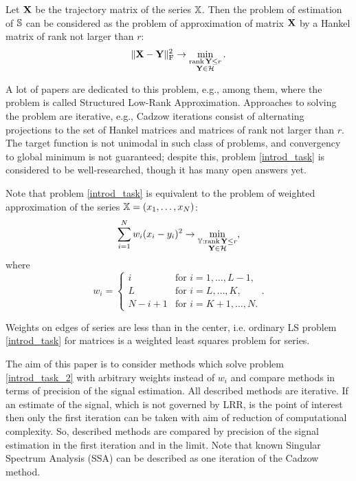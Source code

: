\documentclass[sii]{ipart}
\def\rank{\mathop{\mathrm{rank}}}
\begin{document}
Let $\mathbf{X}$ be the trajectory matrix of the series $\mathbb{X}$. Then the problem of estimation of $\mathbb{S}$ can be considered as the problem of approximation of matrix $\mathbf{X}$ by a Hankel matrix of rank not larger than $r$:
\begin{equation}\label{introd_task}
\|\bfX - \bfY\|^2_\rmF \to \min_{\substack{\rank \bfY \le r \\ \bfY \in \calH}}.
\end{equation}

A lot of papers are dedicated to this problem, e.g., \cite{Cadzow1988, Markovsky2011, Usevich.Markovsky2014, Gillard.Zhigljavsky2013} among them, where the problem is called Structured Low-Rank Approximation. Approaches to solving the problem are iterative, e.g., Cadzow iterations \cite{Cadzow1988} consist of alternating projections to the set of Hankel matrices and matrices of rank not larger than $r$. The target function is not unimodal in such class of problems, and convergency to global minimum is not guaranteed; despite this, problem \eqref{introd_task} is considered to be well-researched, though it has many open answers yet.

Note that problem \eqref{introd_task} is equivalent to the problem of weighted approximation of the series $\mathbb{X} = (x_1, \ldots, x_N)$:
\begin{equation}\label{introd_task_2}
\sum_{i = 1}^N w_i(x_i - y_i)^2 \to \min_{\substack{\tsY: \rank \bfY \le r \\ \bfY \in \calH}},
\end{equation}
where
\begin{equation}
\label{eq:w}
w_i = \begin{cases}
i & \text{for $i = 1, \ldots, L-1,$}\\
L & \text{for $i = L, \ldots, K,$}\\
N - i + 1 & \text{for $i = K + 1, \ldots, N.$}
\end{cases}.
\end{equation}

Weights on edges of series are less than in the center, i.e. ordinary LS problem \eqref{introd_task} for matrices is a weighted least squares problem for series.

The aim of this paper is to consider methods which solve problem \eqref{introd_task_2} with arbitrary weights instead of $w_i$ and compare methods in terms of precision of the signal estimation. All described methods are iterative. If an estimate of the signal, which is not governed by LRR, is the point of interest then only the first iteration can be taken with aim of reduction of computational complexity. So, described methods are compared by precision of the signal estimation in the first iteration and in the limit. Note that known Singular Spectrum Analysis (SSA) \cite{Broomhead.King1986, Vautard.etal1992, Elsner.Tsonis1996, Golyandina.etal2001, Ghil.etal2002, Golyandina.Zhigljavsky2012} can be
described as one iteration of the Cadzow method.
\end{document}
